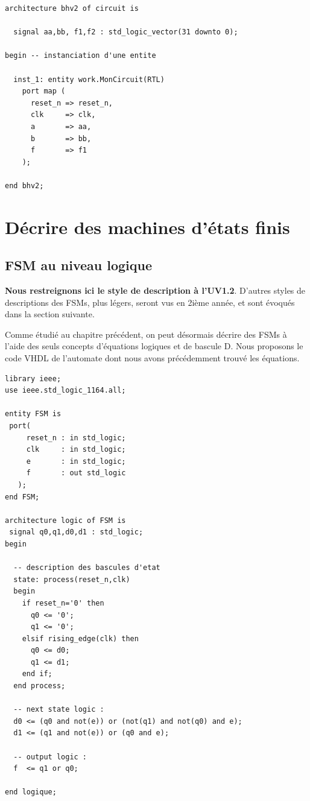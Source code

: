 \begin{lstlisting}[frame=single]
architecture bhv2 of circuit is

  signal aa,bb, f1,f2 : std_logic_vector(31 downto 0);

begin -- instanciation d'une entite

  inst_1: entity work.MonCircuit(RTL)
    port map (
      reset_n => reset_n,
      clk     => clk,
      a       => aa,
      b       => bb,
      f       => f1
    );

end bhv2;
\end{lstlisting}


\section{Décrire des machines d'états finis}

\subsection{FSM au niveau logique}
{\bf Nous restreignons ici le style de description à l'UV1.2}. D'autres styles de descriptions des FSMs, plus légers, seront vus en 2ième année, et sont évoqués dans la section suivante.

Comme étudié au chapitre précédent, on peut désormais décrire des FSMs à l'aide des seuls concepts d'équations logiques et de bascule D. Nous proposons le code VHDL de l'automate dont nous avons
précédemment trouvé les équations.

\begin{lstlisting}[frame=single]
library ieee;
use ieee.std_logic_1164.all;

entity FSM is
 port(
     reset_n : in std_logic;
     clk     : in std_logic;
     e       : in std_logic;
     f       : out std_logic
   );
end FSM;

architecture logic of FSM is
 signal q0,q1,d0,d1 : std_logic;
begin

  -- description des bascules d'etat
  state: process(reset_n,clk)
  begin
    if reset_n='0' then
      q0 <= '0';
      q1 <= '0';
    elsif rising_edge(clk) then
      q0 <= d0;
      q1 <= d1;
    end if;
  end process;

  -- next state logic :
  d0 <= (q0 and not(e)) or (not(q1) and not(q0) and e);
  d1 <= (q1 and not(e)) or (q0 and e);

  -- output logic :
  f  <= q1 or q0;

end logique;
\end{lstlisting}

